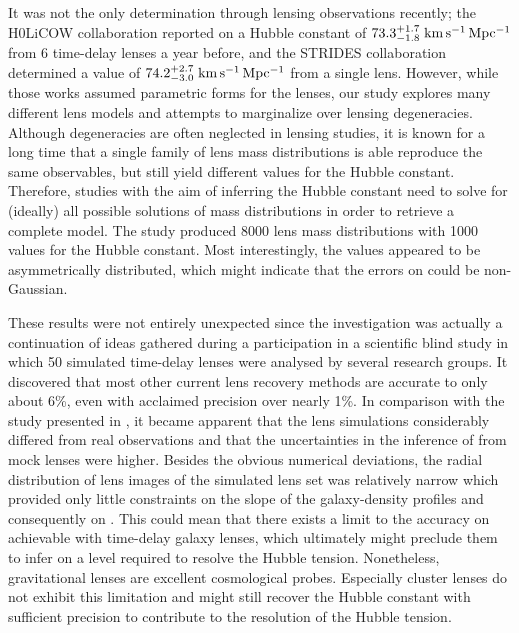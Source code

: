 It was not the only \Ho{} determination through lensing observations recently;
the H0LiCOW collaboration  reported on a Hubble constant of
$73.3^{+1.7}_{-1.8}\;\mathrm{km\,s^{-1}\,Mpc^{-1}}$ from 6 time-delay lenses a year before, and the
STRIDES collaboration  determined a value of
$74.2^{+2.7}_{-3.0}\;\mathrm{km\,s^{-1}\,Mpc^{-1}}$ from a single lens.  However, while those
works assumed parametric forms for the lenses, our study explores many different
lens models and attempts to marginalize over lensing degeneracies.
Although degeneracies are often neglected in lensing studies, it is known for a
long time that a single family of lens mass distributions is able reproduce the
same observables, but still yield different values for the Hubble constant.
Therefore, studies with the aim of inferring the Hubble constant need to solve
for (ideally) all possible solutions of mass distributions in order to retrieve
a complete model.  The study produced 8000 lens mass distributions with 1000
values for the Hubble constant.  Most interestingly, the values appeared to be
asymmetrically distributed, which might indicate that the errors on \Ho{} could
be non-Gaussian.  

These results were not entirely unexpected since the investigation was actually
a continuation of ideas gathered during a participation in a scientific blind
study  in which 50 simulated time-delay lenses were analysed by
several research groups.  It discovered that most other current lens recovery
methods are accurate to only about 6\%, even with acclaimed precision over
nearly 1\%.  In comparison with the study presented in , it became
apparent that the lens simulations considerably differed from real observations
and that the uncertainties in the inference of \Ho{} from mock lenses were
higher.  Besides the obvious numerical deviations, the radial distribution of
lens images of the simulated lens set was relatively narrow which provided only
little constraints on the slope of the galaxy-density profiles and consequently
on \Ho.  This could mean that there exists a limit to the accuracy on \Ho{}
achievable with time-delay galaxy lenses, which ultimately might preclude them
to infer \Ho{} on a level required to resolve the Hubble tension.  Nonetheless,
gravitational lenses are excellent cosmological probes. Especially cluster
lenses do not exhibit this limitation and might still recover the Hubble
constant with sufficient precision to contribute to the resolution of the Hubble
tension.

